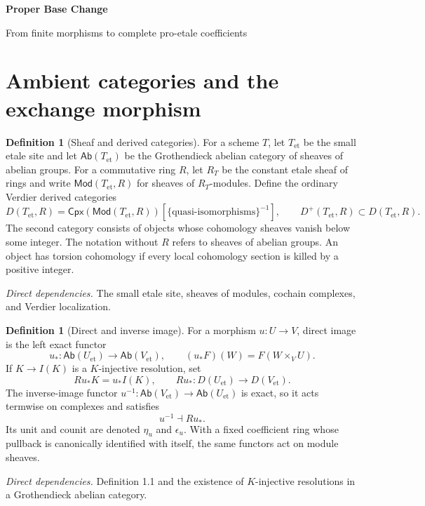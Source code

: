 \documentclass[10pt]{article}
\theoremstyle{definition}
\newtheorem{definition}[theorem]{Definition}
\newcommand{\Ab}{\mathsf{Ab}}
\newcommand{\Mod}{\mathsf{Mod}}
\newcommand{\Ql}{\mathbf Q_\ell}
\newcommand{\Qlb}{\overline{\mathbf Q}_\ell}
\newcommand{\Dplus}{D^+}
\newcommand{\Et}{\mathrm{et}}
\newcommand{\deps}[1]{\par\smallskip\textit{Direct dependencies.} #1\par}
\def\Qlb{Qbar_l}%
\begin{document}
\begin{center}
{\large\bfseries Proper Base Change\par}
\medskip
{\normalsize From finite morphisms to complete pro-etale coefficients\par}
\end{center}

\begin{abstract}
The proper-base-change theorem for torsion coefficients is assembled from
finite morphisms, composition and cancellation, Chow reduction, the
projective line over a strictly henselian base, and invariance for proper
curves under separably closed extension.  It then extends to bounded-below
complexes and passes from the etale site to the pro-etale site.  Derived
completion and finite reduction give the corresponding theorem for complete
adic coefficients, finite extensions of $\Ql$, and the Karoubi-completed
$\Qlb$ category.  All derived categories below are ordinary triangulated
categories.
\end{abstract}

\tableofcontents

\section{Ambient categories and the exchange morphism}

\begin{definition}[Sheaf and derived categories]
For a scheme $T$, let $T_{\Et}$ be the small etale site and let
$\Ab(T_{\Et})$ be the Grothendieck abelian category of sheaves of abelian
groups.  For a commutative ring $R$, let $R_T$ be the constant etale sheaf
of rings and write $\Mod(T_{\Et},R)$ for sheaves of $R_T$-modules.  Define
the ordinary Verdier derived categories
\[
 D(T_{\Et},R)=
 \mathsf{Cpx}(\Mod(T_{\Et},R))
 [\{\text{quasi-isomorphisms}\}^{-1}],
 \qquad \Dplus(T_{\Et},R)\subset D(T_{\Et},R).
\]
The second category consists of objects whose cohomology sheaves vanish
below some integer.  The notation without $R$ refers to sheaves of abelian
groups.  An object has torsion cohomology if every local cohomology section
is killed by a positive integer.
\end{definition}
\deps{The small etale site, sheaves of modules, cochain complexes, and
Verdier localization.}

\begin{definition}[Direct and inverse image]
For a morphism $u:U\to V$, direct image is the left exact functor
\[
 u_*:\Ab(U_{\Et})\longrightarrow\Ab(V_{\Et}),
 \qquad (u_*F)(W)=F(W\times_VU).
\]
If $K\to I(K)$ is a $K$-injective resolution, set
\[
 Ru_*K=u_*I(K),\qquad
 Ru_*:D(U_{\Et})\longrightarrow D(V_{\Et}).
\]
The inverse-image functor $u^{-1}:\Ab(V_{\Et})\to\Ab(U_{\Et})$ is exact,
so it acts termwise on complexes and satisfies
\[
 u^{-1}\dashv Ru_*.
\]
Its unit and counit are denoted $\eta_u$ and $\epsilon_u$.  With a fixed
coefficient ring whose pullback is canonically identified with itself, the
same functors act on module sheaves.
\end{definition}
\deps{Definition 1.1 and the existence of $K$-injective resolutions in a
Grothendieck abelian category.}
\end{document}
